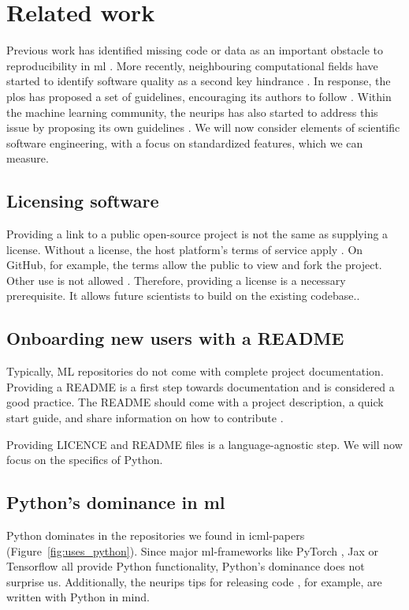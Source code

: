 \section{Related work}
Previous work has identified missing code or data as an important obstacle
to reproducibility in \ac{ml} \cite{hutson2018artificial}.
More recently, neighbouring computational fields have started to identify software quality
as a second key hindrance \cite{hoyt2023improving}.
In response, the \ac{plos} has proposed a set of guidelines, encouraging its authors to follow 
\cite{Yasset2016TenGit,Andreas2012TenSoftware,Kjetil2013TenReproducible,Lost2017TenUsable}.
Within the machine learning community, the \ac{neurips} has also started to address this issue by proposing its own guidelines \cite{NeuripsCodeguide}.
We will now consider elements of scientific software engineering, with a focus on standardized features, which we can measure.



\subsection{Licensing software}
Providing a link to a public open-source project is not the same as supplying a license. Without a license, the host platform's terms of service apply \cite{opensource2025guide}. On GitHub, for example, the terms allow the public to view and fork the project. Other use is not allowed \cite{opensource2025guide}. 
Therefore, providing a license is a necessary prerequisite. It allows future scientists to build on the existing codebase.\cite{Yasset2016TenGit,opensource2025guide}.

\subsection{Onboarding new users with a README}
Typically, ML repositories do not come with complete project documentation. Providing a README is a first step towards documentation and is considered a good practice.
The README should come with a project description, a quick start guide, and share information on how to contribute \cite{NeuripsCodeguide,Yasset2016TenGit}.
 
Providing LICENCE and README files is a language-agnostic step. We will now focus on the specifics of Python.


\subsection{Python's dominance in \ac{ml}}
Python dominates in the repositories we found in \ac{icml}-papers (Figure~\ref{fig:uses_python}). 
Since major \ac{ml}-frameworks like PyTorch \cite{paszke2017automatic},
Jax \cite{jax2018github} or Tensorflow \cite{tensorflow2015-whitepaper} all provide Python functionality, Python's dominance does not surprise us. Additionally, the \ac{neurips} tips for releasing code \cite{NeuripsCodeguide}, for example, are written with Python in mind.

